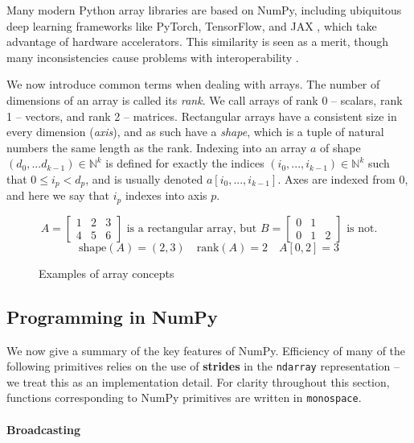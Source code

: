 Many modern Python array libraries are based on NumPy, including ubiquitous deep learning frameworks like PyTorch, TensorFlow, and JAX \cite{frostig2018compiling, paszke2019pytorch, abadi2016tensorflow}, which take advantage of hardware accelerators. This similarity is seen as a merit, though many inconsistencies cause problems with interoperability \cite{meurer2023python}.

We now introduce common terms when dealing with arrays. The number of dimensions of an array is called its \textit{rank}. We call arrays of rank 0  -- scalars, rank 1 -- vectors, and rank 2 -- matrices. Rectangular arrays have a consistent size in every dimension (\textit{axis}), and as such have a \textit{shape}, which is a tuple of natural numbers the same length as the rank. Indexing into an array $a$ of shape $(d_0, ... d_{k-1}) \in \mathbb{N}^k$ is defined for exactly the indices $(i_0, ..., i_{k-1}) \in \mathbb{N}^k$ such that $0 \le i_p < d_p$, and is usually denoted $a[i_0, ..., i_{k-1}]$. Axes are indexed from 0, and here we say that $i_p$ indexes into axis $p$.
\begin{figure}[h]
    \centering
    $$ A = \begin{bmatrix}
        1 & 2 & 3 \\ 
        4 & 5 & 6
    \end{bmatrix} \text{ is a rectangular array, but } B = \begin{bmatrix}
    0 & 1 & \\
    0 & 1 & 2
    \end{bmatrix} \text{ is not.} $$
    $$ \mathrm{shape}(A) = (2, 3)  \quad \mathrm{rank}(A) = 2 \quad A[0, 2] = 3 $$
    \caption{Examples of array concepts}
    \label{fig:array-examples}
\end{figure}

\subsection{Programming in NumPy} 

We now give a summary of the key features of NumPy. Efficiency of many of the following primitives relies on the use of \textbf{strides} in the \texttt{ndarray} representation \cite{harris2020array} -- we treat this as an implementation detail. For clarity throughout this section, functions corresponding to NumPy primitives are written in \texttt{monospace}.

\paragraph{Broadcasting}

